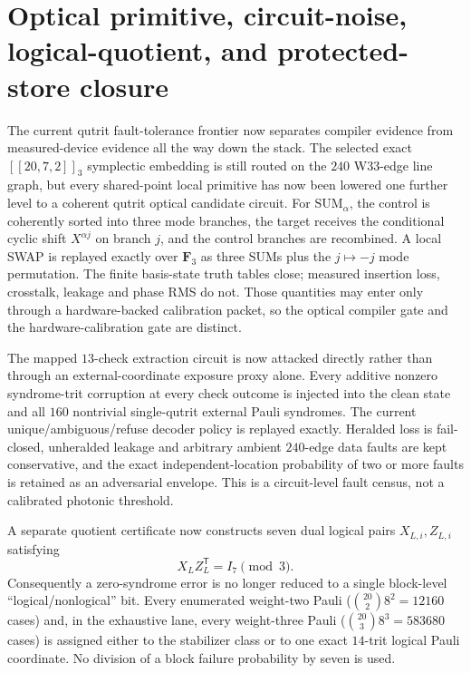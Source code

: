 \section{Optical primitive, circuit-noise, logical-quotient, and protected-store closure}

The current qutrit fault-tolerance frontier now separates compiler evidence from
measured-device evidence all the way down the stack.  The selected exact
$[[20,7,2]]_3$ symplectic embedding is still routed on the $240$ W33-edge line
graph, but every shared-point local primitive has now been lowered one further
level to a coherent qutrit optical candidate circuit.  For
$\mathrm{SUM}_\alpha$, the control is coherently sorted into three mode branches,
the target receives the conditional cyclic shift $X^{\alpha j}$ on branch $j$,
and the control branches are recombined.  A local SWAP is replayed exactly over
$\mathbf F_3$ as three SUMs plus the $j\mapsto-j$ mode permutation.  The finite
basis-state truth tables close; measured insertion loss, crosstalk, leakage and
phase RMS do not.  Those quantities may enter only through a hardware-backed
calibration packet, so the optical compiler gate and the hardware-calibration
gate are distinct.

The mapped $13$-check extraction circuit is now attacked directly rather than
through an external-coordinate exposure proxy alone.  Every additive nonzero
syndrome-trit corruption at every check outcome is injected into the clean state
and all $160$ nontrivial single-qutrit external Pauli syndromes.  The current
unique/ambiguous/refuse decoder policy is replayed exactly.  Heralded loss is
fail-closed, unheralded leakage and arbitrary ambient $240$-edge data faults are
kept conservative, and the exact independent-location probability of two or
more faults is retained as an adversarial envelope.  This is a circuit-level
fault census, not a calibrated photonic threshold.

A separate quotient certificate now constructs seven dual logical pairs
$X_{L,i},Z_{L,i}$ satisfying
\[
  X_L Z_L^{\mathsf T}=I_7\pmod 3.
\]
Consequently a zero-syndrome error is no longer reduced to a single block-level
``logical/nonlogical'' bit.  Every enumerated weight-two Pauli
($\binom{20}{2}8^2=12160$ cases) and, in the exhaustive lane, every weight-three
Pauli ($\binom{20}{3}8^3=583680$ cases) is assigned either to the stabilizer
class or to one exact $14$-trit logical Pauli coordinate.  No division of a
block failure probability by seven is used.

